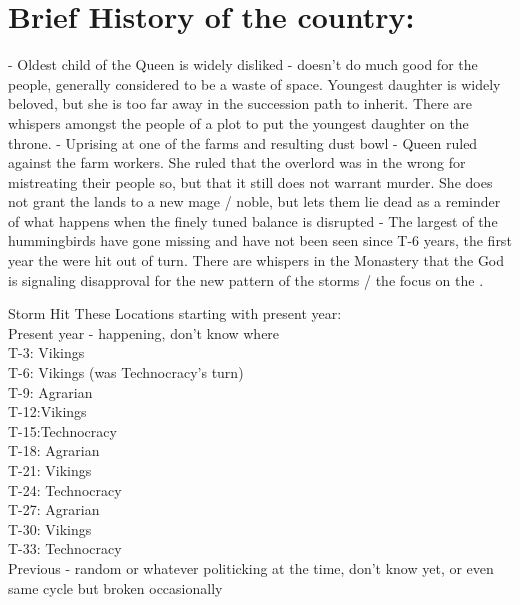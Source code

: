 \documentclass[blue]{GL2020}
\begin{document}
\section*{Brief History of the country:}

 - Oldest child of the Queen is widely disliked - doesn't do much good for the people, generally considered to be a waste of space.  Youngest daughter is widely beloved, but she is too far away in the succession path to inherit.  There are whispers amongst the people of a plot to put the youngest daughter on the throne. %
 - Uprising at one of the farms and resulting dust bowl - Queen ruled against the farm workers.  She ruled that the overlord was in the wrong for mistreating their people so, but that it still does not warrant murder.  She does not grant the lands to a new mage / noble, but lets them lie dead as a reminder of what happens when the finely tuned balance is disrupted
 - The largest of the hummingbirds have gone missing and have not been seen since T-6 years, the first year the \pShip{} were hit out of turn.  There are whispers in the Monastery that the God is signaling disapproval for the new pattern of the storms / the focus on the \pShip{}. %


Storm Hit These Locations starting with present year:\\
Present year - happening, don’t know where\\
T-3: Vikings\\
T-6: Vikings (was Technocracy’s turn)\\
T-9: Agrarian\\
T-12:Vikings\\
T-15:Technocracy\\
T-18: Agrarian\\
T-21: Vikings\\
T-24: Technocracy\\
T-27: Agrarian\\
T-30: Vikings\\
T-33: Technocracy\\
Previous - random or whatever politicking at the time, don’t know yet, or even same cycle but broken occasionally\\
\end{document}
